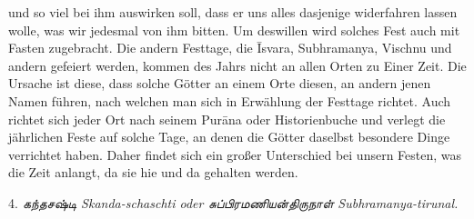 \documentclass{article}
\newcommand{\TamilText}[1]{\texttamil{#1}}
\newcommand{\tam}[1]{\TamilText{#1}}
\begin{document}
und so viel bei ihm auswirken soll, dass er uns alles dasjenige widerfahren lassen wolle, was wir jedesmal von ihm bitten. Um deswillen wird solches Fest auch mit Fasten zugebracht. Die andern Festtage, die \={I}svara, Subhramanya, Vischnu und andern gefeiert werden, kommen des Jahrs nicht an allen Orten zu Einer Zeit. Die Ursache ist diese, dass solche Götter an einem Orte diesen, an andern jenen Namen führen, nach welchen man sich in Erwählung der Festtage richtet. Auch richtet sich jeder Ort nach seinem Pur\={a}na oder Historienbuche und verlegt die jährlichen Feste auf solche Tage, an denen die Götter daselbst besondere Dinge verrichtet haben. Daher findet sich ein großer Unterschied bei unsern Festen, was die Zeit anlangt, da sie hie und da gehalten werden.

\begin{center}
4. \emph{\tam{கந்தசஷ்டி} Skanda-schaschti oder \tam{சுப்பிரமணியன்திருநாள்} Subhramanya-tirunal.}
\end{center}
\end{document}
